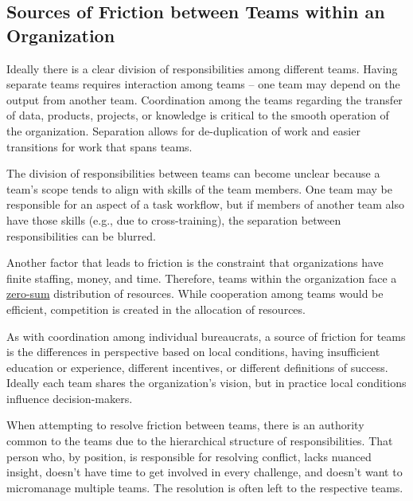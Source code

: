 \subsection*{Sources of Friction between Teams within an Organization}

Ideally there is a clear division of responsibilities among different teams. Having separate teams requires interaction among teams -- one team may depend on the output from another team. Coordination among the teams regarding the transfer of data, products, projects, or knowledge is critical to the smooth operation of the organization. Separation allows for de-duplication of work and easier transitions for work that spans teams. 

The division of  responsibilities between teams can become unclear because a team's scope tends to align with skills of the team members. One team may be responsible for an aspect of a task workflow, but if members of another team also have those skills (e.g., due to cross-training), the separation between responsibilities can be blurred. 
 

Another factor that leads to friction is the constraint that organizations have finite staffing, money, and time. Therefore, teams within the organization face a \href{https://en.wikipedia.org/wiki/Zero-sum_game}{zero-sum}
distribution of resources. While cooperation among teams would be efficient, competition is created in the allocation of resources.

As with coordination among individual bureaucrats, a source of friction for teams is the differences in perspective based on local conditions, having insufficient education or experience, different incentives, or different definitions of success. Ideally each team shares the organization's vision, but in practice local conditions influence decision-makers.

When attempting to resolve friction between teams, there is an authority common to the teams due to the hierarchical structure of responsibilities. That person who, by position, is responsible for resolving conflict, lacks nuanced insight, doesn't have time to get involved in every challenge, and doesn't want to micromanage multiple teams. The resolution is often left to the respective teams. 


